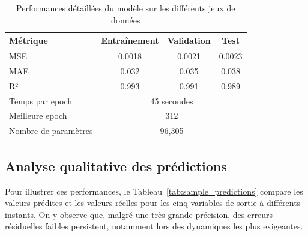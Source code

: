 \documentclass[12pt, a4paper]{report}
\begin{document}
\begin{table}[H]
\centering
\caption{Performances détaillées du modèle sur les différents jeux de données}
\label{tab:performances_detail}
\begin{tabular}{|l|c|c|c|}
\hline
\textbf{Métrique} & \textbf{Entraînement} & \textbf{Validation} & \textbf{Test} \\
\hline
MSE & 0.0018 & 0.0021 & 0.0023 \\
MAE & 0.032 & 0.035 & 0.038 \\
R² & 0.993 & 0.991 & 0.989 \\
\hline
Temps par epoch & \multicolumn{3}{c|}{45 secondes} \\
Meilleure epoch & \multicolumn{3}{c|}{312} \\
Nombre de paramètres & \multicolumn{3}{c|}{96,305} \\
\hline
\end{tabular}
\end{table}

\subsection{Analyse qualitative des prédictions}

Pour illustrer ces performances, le Tableau~\ref{tab:sample_predictions} compare les valeurs prédites et les valeurs réelles pour les cinq variables de sortie à différents instants. On y observe que, malgré une très grande précision, des erreurs résiduelles faibles persistent, notamment lors des dynamiques les plus exigeantes.
\end{document}
